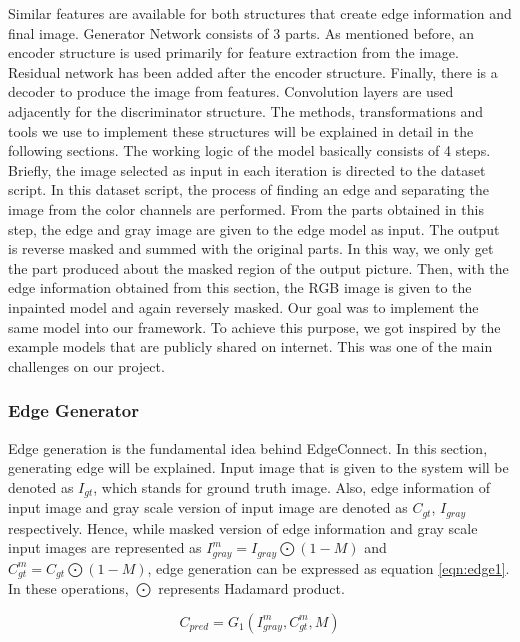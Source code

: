 Similar features are available for both structures that create edge information and final image. Generator Network consists of 3 parts. As mentioned before, an encoder structure is used primarily for feature extraction from the image. Residual network has been added after the encoder structure. Finally, there is a decoder to produce the image from features. Convolution layers are used adjacently for the discriminator structure.
The methods, transformations and tools we use to implement these structures will be explained in detail in the following sections.\newline
The working logic of the model basically consists of 4 steps. Briefly, the image selected as input in each iteration is directed to the dataset script. In this dataset script, the process of finding an edge and separating the image from the color channels are performed. From the parts obtained in this step, the edge and gray image are given to the edge model as input. The output is reverse masked and summed with the original parts. In this way, we only get the part produced about the masked region of the output picture. Then, with the edge information obtained from this section, the RGB image is given to the inpainted model and again reversely masked. \newline
Our goal was to implement the same model into our framework. To achieve this purpose, we got inspired by the example models that are publicly shared on internet. This was one of the main challenges on our project.  


\subsubsection{Edge Generator}

Edge generation is the fundamental idea behind EdgeConnect. In this section, generating edge will be explained.
Input image that is given to the system will be denoted as \(I_{gt}\), which stands for ground truth image. Also, edge information of input image and gray scale version of input image are denoted as \(C_{gt}\), \(I_{gray}\) respectively. Hence, while masked version of edge information and gray scale input images are represented as \(I^m_{gray}=I_{gray} \bigodot (1-M)\)  and \(C^m_{gt}=C_{gt}\bigodot(1-M)\), edge generation can be expressed as equation \ref{eqn:edge1}. In these operations, \(\bigodot\) represents Hadamard product.

\begin{equation}
\label{eqn:edge1}
    C_{pred} = G_{1}(I^{m}_{gray}, C^{m}_{gt}, M)
\end{equation}


